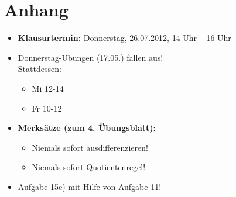 \chapter*{Anhang}
\begin{itemize}
 \item \textbf{Klausurtermin:} Donnerstag, 26.07.2012, 14 Uhr – 16 Uhr
 \item Donnerstag-Übungen (17.05.) fallen aus!\\
   Stattdessen:
 \begin{itemize}
   \item Mi 12-14
   \item Fr 10-12
 \end{itemize}
 \item \textbf{Merksätze (zum 4. Übungsblatt):}
 \begin{itemize}
  \item Niemals sofort ausdifferenzieren!
  \item Niemals sofort Quotientenregel!
 \end{itemize}
 \item Aufgabe 15c) mit Hilfe von Aufgabe 11!
\end{itemize}
